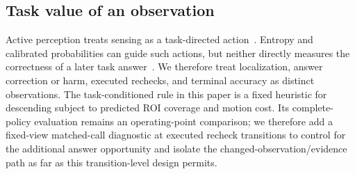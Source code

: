 

\subsection{Task value of an observation}
Active perception treats sensing as a task-directed action~\cite{bajcsy1988active}. Entropy and calibrated probabilities can guide such actions, but neither directly measures the correctness of a later task answer~\cite{guo2017calibration,ovadia2019can}. We therefore treat localization, answer correction or harm, executed rechecks, and terminal accuracy as distinct observations. The task-conditioned rule in this paper is a fixed heuristic for descending subject to predicted ROI coverage and motion cost. Its complete-policy evaluation remains an operating-point comparison; we therefore add a fixed-view matched-call diagnostic at executed recheck transitions to control for the additional answer opportunity and isolate the changed-observation/evidence path as far as this transition-level design permits.
